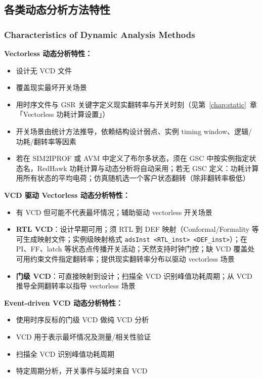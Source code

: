 \subsection{各类动态分析方法特性}
\subsubsection*{Characteristics of Dynamic Analysis Methods}

\textbf{Vectorless 动态分析特性：}
\begin{itemize}
  \item 设计无 VCD 文件
  \item 覆盖现实最坏开关场景
  \item 用时序文件与 GSR 关键字定义现实翻转率与开关时刻（见第~\ref{chap:static}~章「Vectorless 功耗计算设置」）
  \item 开关场景由统计方法推导，依赖结构设计弱点、实例 timing window、逻辑/功耗/翻转率等因素
  \item 若在 SIM2IPROF 或 AVM 中定义了布尔多状态，须在 GSC 中按实例指定状态名，RedHawk 功耗计算与动态分析将自动采用；若无 GSC 定义：功耗计算用所有状态的平均电荷；仿真随机选一个客户状态翻转（除非翻转率极低）
\end{itemize}

\textbf{VCD 驱动 Vectorless 动态分析特性：}
\begin{itemize}
  \item 有 VCD 但可能不代表最坏情况；辅助驱动 vectorless 开关场景
  \item \textbf{RTL VCD}：设计早期可用；须 RTL 到 DEF 映射（Conformal/Formality 等可生成映射文件；实例级映射格式 \texttt{adsInst <RTL\_inst> <DEF\_inst>}）；在 PI、FF、latch 等状态点传播开关活动；天然支持时钟门控；缺 VCD 覆盖处可用约束文件指定翻转率；提供现实翻转率分布以驱动 vectorless 场景
  \item \textbf{门级 VCD}：可直接映射到设计；扫描全 VCD 识别峰值功耗周期；从 VCD 推导全网翻转率以指导 vectorless 场景
\end{itemize}

\textbf{Event-driven VCD 动态分析特性：}
\begin{itemize}
  \item 使用时序反标的门级 VCD 做纯 VCD 分析
  \item VCD 用于表示最坏情况及测量/相关性验证
  \item 扫描全 VCD 识别峰值功耗周期
  \item 特定周期分析，开关事件与延时来自 VCD
\end{itemize}

